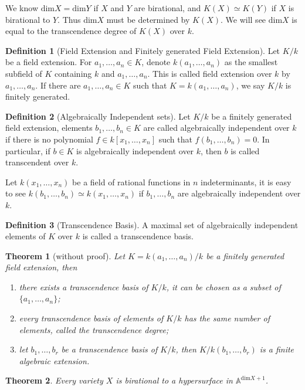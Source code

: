 \documentclass{amsart}
\theoremstyle{plain}
\newtheorem{theorem}{Theorem}
\theoremstyle{definition}
\newtheorem{definition}{Definition}
\theoremstyle{remark}
\numberwithin{equation}{section}
\begin{document}
We know $ \text{dim}X=\text{dim}Y $ if $ X $ and $ Y $ are birational, and $ K(X)\simeq K(Y) $ if $ X $ is birational to $ Y $. Thus $ \text{dim}X $ must be determined by $ K(X) $. We will see $ \text{dim}X $ is equal to the transcendence degree of $ K(X) $ over $ k $.
\begin{definition}[Field Extension and Finitely generated Field Extension]
	Let $ K/k $ be a field extension. For $ a_1,\dots,a_n\in K $, denote $ k(a_1,\dots,a_n) $ as the smallest subfield of $ K $ containing $ k $ and $ a_1,\dots,a_n $. This is called field extension over $ k $ by $ a_1,\dots,a_n $. If there are $ a_1,\dots,a_n\in K $ such that $ K=k(a_1,\dots,a_n) $, we say $ K/k $ is finitely generated.
\end{definition}
\begin{definition}[Algebraically Independent sets]
	Let $ K/k $ be a finitely generated field extension, elements $ b_1,\dots,b_n\in K $ are called algebraically independent over $ k $ if there is no polynomial $ f\in k [x_1,\dots,x_n] $ such that $ f(b_1,\dots,b_n)=0 $. In particular, if $ b\in K $ is algebraically independent over $ k $, then $ b $ is called transcendent over $ k $.
\end{definition}
Let $ k(x_1,\dots,x_n) $ be a field of rational functions in $ n $ indeterminants, it is easy to see $ k(b_1,\dots,b_n)\simeq k(x_1,\dots,x_n) $ if $ b_1,\dots,b_n $ are algebraically independent over $ k $.
\begin{definition}[Transcendence Basis]
	A maximal set of algebraically independent elements of $ K $ over $ k $ is called a transcendence basis.
\end{definition}
\begin{theorem}[without proof]
	Let $ K=k(a_1,\dots,a_n)/k $ be a finitely generated field extension, then \begin{enumerate}
		\item there exists a transcendence basis of $ K/k $, it can be chosen as a subset of $ \lbrace a_1,\dots,a_n\rbrace $;
		\item every transcendence basis of elements of $ K/k $ has the same number of elements, called the transcendence degree;
		\item let $ b_1,\dots,b_r $ be a transcendence basis of $ K/k $, then $ K/k(b_1,\dots,b_r) $ is a finite algebraic extension.
	\end{enumerate}
\end{theorem}
\begin{theorem}\label{16-2}
	Every variety $ X $ is birational to a hypersurface in $ \mathbb{A}^{\text{dim}X+1} $.
\end{theorem}
\end{document}
